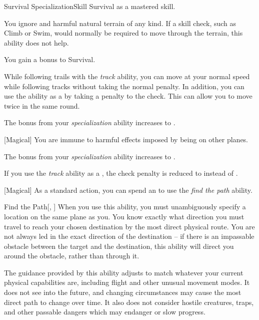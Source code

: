     \begin{feat}{Survival Specialization}{Skill}
        \featpre Survival as a mastered skill.

         You ignore  and harmful natural terrain of any kind.
        If a skill check, such as Climb or Swim, would normally be required to move through the terrain, this ability does not help.

         You gain a  bonus to Survival.

        While following trails with the \textit{track} ability, you can move at your normal speed while following tracks without taking the normal  penalty.
        In addition, you can use the ability as a  by taking a  penalty to the check.
        This can allow you to move twice in the same round.

         The bonus from your \textit{specialization} ability increases to .

        [Magical] You are immune to harmful effects imposed by being on other planes.

         The bonus from your \textit{specialization} ability increases to .

         If you use the \textit{track} ability as a , the check penalty is reduced to  instead of .

        [Magical] As a standard action, you can spend an  to use the \textit{find the path} ability.
        \begin{ability}{Find the Path}[, ]
            When you use this ability, you must unambiguously specify a location on the same plane as you.
            You know exactly what direction you must travel to reach your chosen destination by the most direct physical route.
            You are not always led in the exact direction of the destination -- if there is an impassable obstacle between the target and the destination, this ability will direct you around the obstacle, rather than through it.

            The guidance provided by this ability adjusts to match whatever your current physical capabilities are, including flight and other unusual movement modes. It does not see into the future, and changing circumstances may cause the most direct path to change over time.
            It also does not consider hostile creatures, traps, and other passable dangers which may endanger or slow progress.
        \end{ability}
    \end{feat}

